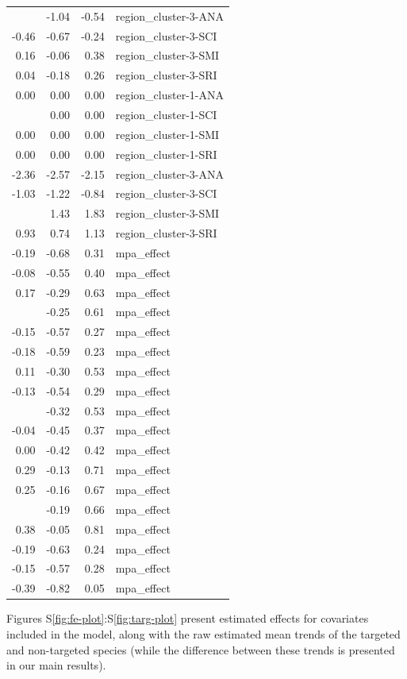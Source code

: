 \documentclass[]{article}
\begin{document}
\begin{longtable}[t]{rrrl}
\addlinespace
-0.79 & -1.04 & -0.54 & region\_cluster-3-ANA\\
-0.46 & -0.67 & -0.24 & region\_cluster-3-SCI\\
0.16 & -0.06 & 0.38 & region\_cluster-3-SMI\\
0.04 & -0.18 & 0.26 & region\_cluster-3-SRI\\
0.00 & 0.00 & 0.00 & region\_cluster-1-ANA\\
\addlinespace
0.00 & 0.00 & 0.00 & region\_cluster-1-SCI\\
0.00 & 0.00 & 0.00 & region\_cluster-1-SMI\\
0.00 & 0.00 & 0.00 & region\_cluster-1-SRI\\
-2.36 & -2.57 & -2.15 & region\_cluster-3-ANA\\
-1.03 & -1.22 & -0.84 & region\_cluster-3-SCI\\
\addlinespace
1.63 & 1.43 & 1.83 & region\_cluster-3-SMI\\
0.93 & 0.74 & 1.13 & region\_cluster-3-SRI\\
-0.19 & -0.68 & 0.31 & mpa\_effect\\
-0.08 & -0.55 & 0.40 & mpa\_effect\\
0.17 & -0.29 & 0.63 & mpa\_effect\\
\addlinespace
0.18 & -0.25 & 0.61 & mpa\_effect\\
-0.15 & -0.57 & 0.27 & mpa\_effect\\
-0.18 & -0.59 & 0.23 & mpa\_effect\\
0.11 & -0.30 & 0.53 & mpa\_effect\\
-0.13 & -0.54 & 0.29 & mpa\_effect\\
\addlinespace
0.10 & -0.32 & 0.53 & mpa\_effect\\
-0.04 & -0.45 & 0.37 & mpa\_effect\\
0.00 & -0.42 & 0.42 & mpa\_effect\\
0.29 & -0.13 & 0.71 & mpa\_effect\\
0.25 & -0.16 & 0.67 & mpa\_effect\\
\addlinespace
0.24 & -0.19 & 0.66 & mpa\_effect\\
0.38 & -0.05 & 0.81 & mpa\_effect\\
-0.19 & -0.63 & 0.24 & mpa\_effect\\
-0.15 & -0.57 & 0.28 & mpa\_effect\\
-0.39 & -0.82 & 0.05 & mpa\_effect\\*
\end{longtable}

Figures S\ref{fig:fe-plot}:S\ref{fig:targ-plot} present estimated effects for covariates included in the model, along with the raw estimated mean trends of the targeted and non-targeted species (while the difference between these trends is presented in our main results).
\end{document}
